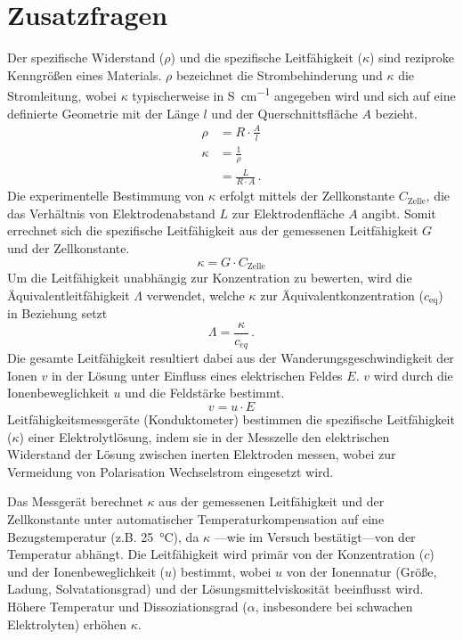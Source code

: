 \section{Zusatzfragen}
Der spezifische Widerstand ($\rho$) und die spezifische Leitfähigkeit ($\kappa$) sind reziproke Kenngrößen eines Materials.
$\rho$ bezeichnet die Strombehinderung und $\kappa$ die Stromleitung, wobei $\kappa$ typischerweise in \unit{\siemens\per\centi\meter} angegeben wird und sich auf eine definierte Geometrie
mit der Länge $l$ und der Querschnittsfläche $A$ bezieht.
\begin{align}
    \rho &= R \cdot \frac{A}{l} \\
    \kappa &= \frac{1}{\rho} \\
           &= \frac{L}{R \cdot A}\, \text{.}
\end{align}
Die experimentelle Bestimmung von $\kappa$ erfolgt mittels der Zellkonstante $C_{\text{Zelle}}$, die das Verhältnis von Elektrodenabstand $L$ zur Elektrodenfläche $A$ angibt.
Somit errechnet sich die spezifische Leitfähigkeit aus der gemessenen Leitfähigkeit $G$ und der Zellkonstante.\autocite{jander/blasius2}
\begin{equation}
    \kappa = G \cdot C_{\text{Zelle}}
\end{equation}
Um die Leitfähigkeit unabhängig zur Konzentration zu bewerten, wird die Äquivalentleitfähigkeit $\Lambda$ verwendet\autocite{job-ruffler-phys-chem:equivalent}, welche $\kappa$ zur Äquivalentkonzentration ($c_{\text{eq}}$) in Beziehung setzt
\begin{equation}
    \Lambda = \frac{\kappa}{c_{eq}}\, \text{.}
\end{equation}
Die gesamte Leitfähigkeit resultiert dabei aus der Wanderungsgeschwindigkeit der Ionen $v$ in der Lösung unter Einfluss eines elektrischen Feldes $E$.
$v$ wird durch die Ionenbeweglichkeit $u$ und die Feldstärke bestimmt.\autocite{job-ruffler-phys-chem:wanderungsgeschwindigkeit}
\begin{equation}
    v = u \cdot E
\end{equation}
Leitfähigkeitsmessgeräte (Konduktometer) bestimmen die spezifische Leitfähigkeit ($\kappa$) einer Elektrolytlösung, indem sie in der Messzelle den elektrischen Widerstand der Lösung zwischen inerten Elektroden messen, wobei zur Vermeidung von Polarisation Wechselstrom eingesetzt wird\autocite{job-ruffler-phys-chem:konduktometer}.

Das Messgerät berechnet $\kappa$ aus der gemessenen Leitfähigkeit und der Zellkonstante unter automatischer Temperaturkompensation auf eine Bezugstemperatur (z.B. \qty{25}{\degreeCelsius}), da $\kappa$ ---wie im Versuch bestätigt---von der Temperatur abhängt.
Die Leitfähigkeit wird primär von der Konzentration ($c$) und der Ionenbeweglichkeit ($u$) bestimmt\autocite{atkins-leitfähigkeit}, wobei $u$ von der Ionennatur (Größe, Ladung, Solvatationsgrad) und der Lösungsmittelviskosität beeinflusst wird.
Höhere Temperatur und Dissoziationsgrad ($\alpha$, insbesondere bei schwachen Elektrolyten) erhöhen $\kappa$\autocite{atkins-beweglichkeit}.

